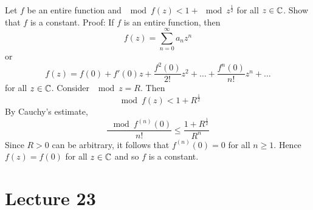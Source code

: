 \documentclass[12pt]{article}
\begin{document}
Let $f$ be an entire function and $\mod{f(z)} < 1 + \mod{z}^{\frac{1}{2}}$ for all $z \in \mathbb{C}$. Show that $f$ is a constant. Proof: If $f$ is an entire function, then $$ f(z) = \sum_{n=0}^\infty a_nz^n$$ or $$f(z) = f(0) + f'(0)z + \frac{f^2(0)}{2!}z^2 + \dots + \frac{f^n(0)}{n!}z^n + \dots $$ for all $z \in \mathbb{C}$. Consider $\mod{z} = R$. Then $$ \mod{f(z)} < 1 + R^{\frac{1}{2}}$$ By Cauchy's estimate, $$ \frac{\mod{f^{(n)}(0)}}{n!} \leq \frac{1 + R^{\frac{1}{2}}}{R^n} $$ Since $R>0$ can be arbitrary, it follows that $f^{(n)}(0) = 0$ for all $n \geq 1$. Hence $f(z) = f(0)$ for all $z \in \mathbb{C}$ and so $f$ is a constant. 

\section{Lecture 23} 
\end{document}
